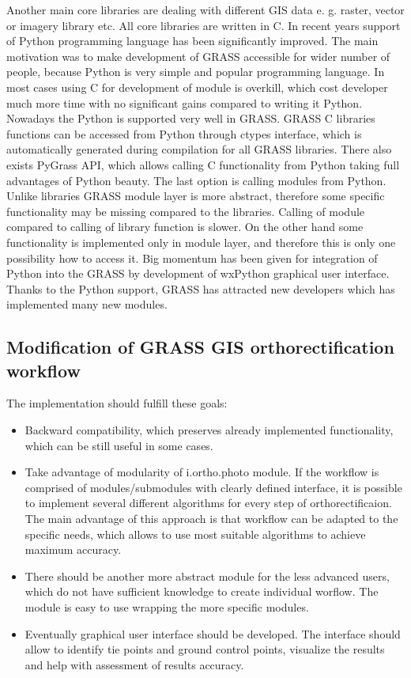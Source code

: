 \documentclass[a4paper,12pt]{article}
\begin{document}
Another main core libraries are dealing with different GIS data e. g. raster, vector or imagery library etc. 
All core libraries are written in C. In recent years support of Python programming language has been significantly 
improved. The main motivation was to make development of GRASS accessible for wider number 
of people, because Python is very simple and popular programming language. In most cases using 
C for development of module is overkill, which cost developer much more time 
with no significant gains compared to writing it Python. Nowadays the Python is supported very well in GRASS.
GRASS C libraries functions can be accessed from Python through ctypes interface, which is automatically generated during compilation
for all GRASS libraries.  
There also exists 
PyGrass API, which allows calling C functionality from Python taking full advantages of Python beauty.
The last option is calling modules from Python. Unlike libraries GRASS module layer is more abstract, 
therefore some specific functionality may be missing compared to the libraries. Calling of module
compared to calling of library function is slower.
On the other hand some functionality is implemented
only in module layer, and therefore this is only one possibility how to access it.
Big momentum has been given for integration of Python into the GRASS by development of wxPython graphical
user interface. 
Thanks to the Python support, GRASS has attracted new developers which has implemented many new modules.

\subsection{Modification of GRASS GIS orthorectification workflow}

The implementation should fulfill these goals:

\begin{itemize}
\item Backward compatibility, which preserves already implemented functionality, which
can be still useful in some cases. 
\item Take advantage of modularity of i.ortho.photo module.
If the workflow is comprised of modules/submodules with clearly defined interface, it is possible to implement
several different algorithms for every step of orthorectificaion. The main advantage of this 
approach is that workflow can be adapted to the specific needs, which allows to use 
most suitable algorithms to achieve maximum accuracy.
\item There should be another more abstract module for the less advanced users, which do not have sufficient knowledge to create individual 
worflow.
The module is easy to use wrapping the more specific modules.
\item Eventually graphical user interface should be developed. The interface should 
allow to identify tie points and ground control points, visualize the results and help with assessment of results accuracy.  
\end{itemize}
\end{document}
